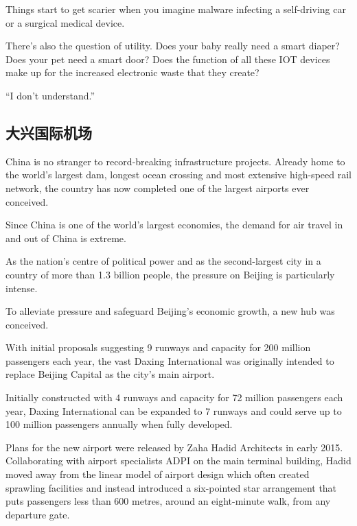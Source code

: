 Things start to get scarier when you imagine malware infecting a self-driving car or a surgical medical device.

There's also the question of utility. Does your baby really need a smart diaper? Does your pet need a smart door? Does the function of all these IOT devices make up for the increased electronic waste that they create?

“I don't understand.”
\subsection{大兴国际机场}
\begin{margintable}\vspace{-2cm}\footnotesize
\end{margintable}
China is no stranger to record-breaking infrastructure projects. Already home to the world's largest dam, longest ocean crossing and most extensive high-speed rail network, the country has now completed one of the largest airports ever conceived.

Since China is one of the world's largest economies, the demand for air travel in and out
of China is extreme.

As the nation's centre of political power and as the second-largest city in a country of more than 1.3 billion people, the pressure on Beijing is particularly intense.

To alleviate pressure and safeguard Beijing's economic growth, a new hub was conceived.

With initial proposals suggesting 9 runways and capacity for 200 million passengers each year, the vast Daxing International was originally intended to replace Beijing Capital as the city's main airport.

Initially constructed with 4 runways and capacity for 72 million passengers each year, Daxing International can be expanded to 7 runways and could serve up to 100 million passengers annually when fully developed.

Plans for the new airport were released by Zaha Hadid Architects in early 2015. Collaborating with airport specialists ADPI on the main terminal building, Hadid moved away from the linear model of airport design which often created sprawling facilities and instead introduced a six-pointed star arrangement that puts passengers less than 600 metres, around an eight-minute walk, from any departure gate.

